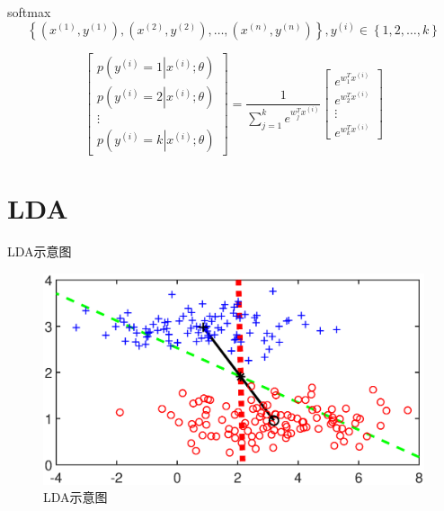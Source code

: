 \documentclass[xetex,mathserif,serif]{beamer}
\begin{document}
\begin{frame}{softmax}
    \[\left\{ {\left( {{x^{\left( 1 \right)}},{y^{\left( 1 \right)}}} \right),\left( {{x^{\left( 2 \right)}},{y^{\left( 2 \right)}}} \right), \ldots ,\left( {{x^{\left( n \right)}},{y^{\left( n \right)}}} \right)} \right\},{y^{\left( i \right)}} \in \left\{ {1,2, \ldots ,k} \right\}\]

    \[\left[ {\begin{array}{*{20}{c}}
    {p\left( {{y^{\left( i \right)}} = 1\left| {{x^{\left( i \right)}};\theta } \right.} \right)}\\
    {p\left( {{y^{\left( i \right)}} = 2\left| {{x^{\left( i \right)}};\theta } \right.} \right)}\\
     \vdots \\
    {p\left( {{y^{\left( i \right)}} = k\left| {{x^{\left( i \right)}};\theta } \right.} \right)}
    \end{array}} \right] = \frac{1}{{\sum\limits_{j = 1}^k {{e^{w_j^T{x^{\left( i \right)}}}}} }}\left[ {\begin{array}{*{20}{c}}
    {{e^{w_1^T{x^{\left( i \right)}}}}}\\
    {{e^{w_2^T{x^{\left( i \right)}}}}}\\
     \vdots \\
    {{e^{w_k^T{x^{\left( i \right)}}}}}
    \end{array}} \right]\]
\end{frame}

\section{LDA}

\begin{frame}{LDA示意图}
\begin{figure}
  \centering
  \includegraphics[width=\textwidth]{lda.eps}
  \caption{LDA示意图}\label{4}
\end{figure}

\end{frame}
\end{document}
